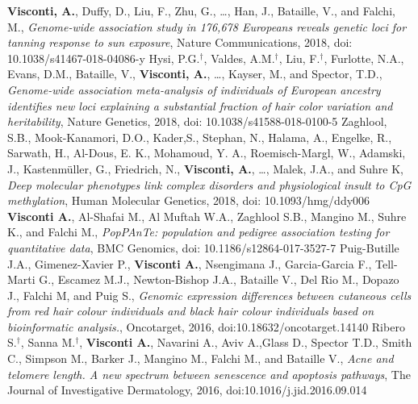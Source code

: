 \documentclass[a4paper,10pt]{article}
\begin{document}
{\begin{itemize}
		  \textbf{Visconti, A.}, Duffy, D., Liu, F., Zhu, G., \dots, Han, J., Bataille, V., and Falchi, M., \emph{Genome-wide association study in 176,678 Europeans reveals genetic loci for tanning response to sun exposure}, Nature Communications, 2018, doi: 10.1038/s41467-018-04086-y
		  Hysi, P.G.$^{\textbf{$\dag $}}$, Valdes, A.M.$^{\textbf{$\dag $}}$, Liu, F.$^{\textbf{$\dag $}}$, Furlotte, N.A., Evans, D.M., Bataille, V., \textbf{Visconti, A.}, \dots, Kayser, M., and Spector, T.D., \emph{Genome-wide association meta-analysis of individuals of European ancestry identifies new loci explaining a substantial fraction of hair color variation and heritability}, Nature Genetics, 2018, doi: 10.1038/s41588-018-0100-5
 		 Zaghlool, S.B., Mook-Kanamori, D.O., Kader,S., Stephan, N., Halama, A., Engelke, R., Sarwath, H., Al-Dous, E. K., Mohamoud, Y. A., Roemisch-Margl, W., Adamski, J., Kastenmüller, G., Friedrich, N., \textbf{Visconti, A.}, \dots, Malek, J.A., and Suhre K, \emph{Deep molecular phenotypes link complex disorders and physiological insult to CpG methylation}, Human Molecular Genetics, 2018, doi: 10.1093/hmg/ddy006
		 \textbf{Visconti A.}, Al-Shafai M.,  Al Muftah W.A.,  Zaghlool S.B., Mangino M., Suhre K., and Falchi M., \emph{PopPAnTe: population and pedigree association testing for quantitative data}, BMC Genomics, doi: 10.1186/s12864-017-3527-7
		 Puig-Butille J.A., Gimenez-Xavier P., \textbf{Visconti A.}, Nsengimana J., Garcia-Garcia F., Tell-Marti G., Escamez M.J., Newton-Bishop J.A., Bataille V., Del Rio M., Dopazo J., Falchi M, and Puig S., \emph{Genomic expression differences between cutaneous cells from red hair colour individuals and black hair colour individuals based on bioinformatic analysis.}, Oncotarget, 2016, doi:10.18632/oncotarget.14140
		 Ribero S.$^{\textbf{$\dag $}}$, Sanna M.$^{\textbf{$\dag $}}$, \textbf{Visconti A.}, Navarini A., Aviv A.,Glass D., Spector T.D., Smith C., Simpson M., Barker J., Mangino M., Falchi M., and Bataille V., \emph{Acne and telomere length. A new spectrum between senescence and apoptosis pathways}, The Journal of Investigative Dermatology, 2016, doi:10.1016/j.jid.2016.09.014 
	\end{itemize}
}
\end{document}
